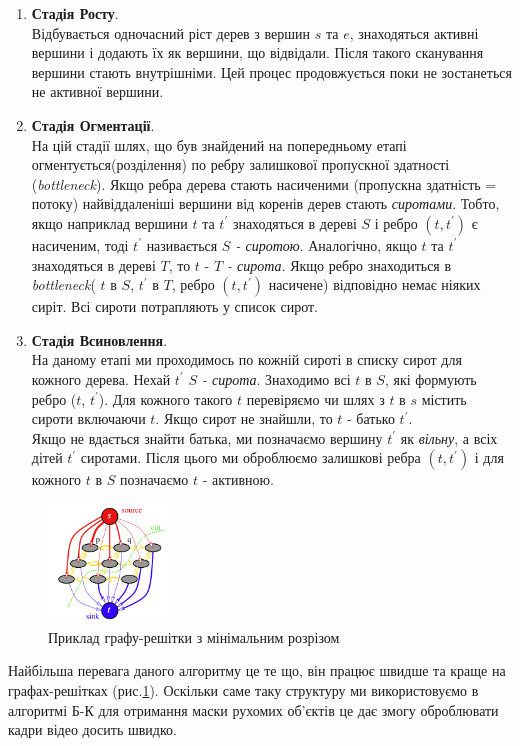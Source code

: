 \begin{enumerate}
    \item \textbf{Стадія Росту}. \\
        Відбувається одночасний ріст дерев з вершин $s$ та $e$, знаходяться активні
        вершини і додають їх як вершини, що відвідали. Після такого сканування вершини 
        стають внутрішніми. Цей процес продовжується поки не зостанеться не активної вершини.
    \item \textbf{Стадія Огментації}. \\
        На цій стадії шлях, що був знайдений на попередньому етапі огментується(розділення)
        по ребру залишкової пропускної здатності (\textit{bottleneck}). Якщо ребра дерева стають 
        насиченими (пропускна здатність = потоку) найвіддаленіші вершини від коренів дерев стають
        \textit{сиротами}. Тобто, якщо наприклад вершини $t$ та $t^{'}$ знаходяться в дереві $S$
        і ребро $(t,t^{'})$ є насиченим, тоді $t^{'}$ називається \textit{$S$ - сиротою}.
        Аналогічно, якщо $t$ та $t^{'}$ знаходяться в дереві $T$, то  $t$ - \textit{$T$ - сирота}.
        Якщо ребро знаходиться в \textit{bottleneck}( $t$ в $S$, $t^{'}$ в $T$, ребро $(t,t^{'})$ 
        насичене) відповідно немає ніяких сиріт. Всі сироти потрапляють у список сирот. 
    \item \textbf{Стадія Всиновлення}. \\
        На даному етапі ми проходимось по кожній сироті в списку сирот для кожного дерева.
        Нехай $t^{'}$ \textit{$S$ - сирота}. Знаходимо всі $t$  в $S$, які формують ребро 
        ($t$, $t^{'}$). Для кожного такого $t$ перевіряємо чи шлях з $t$ в $s$ містить сироти
        включаючи $t$. Якщо сирот не знайшли, то $t$ - батько  $t^{'}$. \\
        Якщо не вдається знайти батька, ми позначаємо вершину $t^{'}$ як \textit{вільну}, а всіх
        дітей $t^{'}$ сиротами. Після цього ми оброблюємо залишкові ребра $(t,t^{'})$ і для кожного $t$ в $S$ позначаємо
        $t$ - активною. 
\end{enumerate}


\begin{figure}[h]
    \centering
    \includegraphics[width=0.3\textwidth]{images/graph_cut}
    \caption{Приклад графу-решітки з мінімальним розрізом
    \label{fig:graph_lattice}
    }
\end{figure}

Найбільша перевага даного алгоритму це те що, він працює швидше та краще на графах-решітках 
(рис.\ref{fig:graph_lattice}).
Оскільки саме таку структуру ми використовуємо в алгоритмі Б-К для отримання маски рухомих 
об'єктів це дає змогу оброблювати кадри відео досить швидко.

